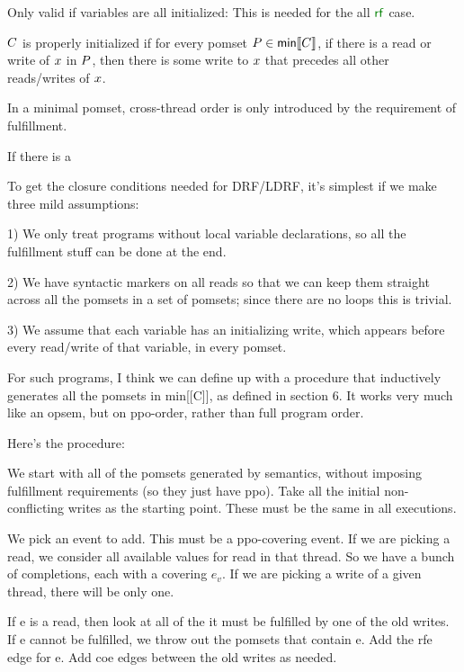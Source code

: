 

\begin{scope}
  \color{red}

  Only valid if variables are all initialized:
  This is needed for the all $\rrf$ case.
  
  $C$ is properly initialized if for every pomset
  $P\in\textsf{min}\llbracket C\rrbracket$, if there is a read or write of $x$ in $P$,
  then there is some write to $x$ that precedes all other reads/writes of
  $x$.


  In a minimal pomset, cross-thread order is only introduced by the
  requirement of fulfillment.

  If there is a 


  To get the closure conditions needed for DRF/LDRF, it's simplest if we make
  three mild assumptions:

  1) We only treat programs without local variable declarations, so all the
  fulfillment stuff can be done at the end.

  2) We have syntactic markers on all reads so that we can keep them straight
  across all the pomsets in a set of pomsets; since there are no loops this
  is trivial.

  3) We assume that each variable has an initializing write, which appears
  before every read/write of that variable, in every pomset.

  For such programs, I think we can define up with a procedure that
  inductively generates all the pomsets in min[[C]], as defined in section 6.
  It works very much like an opsem, but on ppo-order, rather than full
  program order.

  Here's the procedure:
  
  We start with all of the pomsets generated by semantics, without imposing
  fulfillment requirements (so they just have ppo).  Take all the initial
  non-conflicting writes as the starting point.  These must be the same in
  all executions.

  We pick an event to add.  This must be a ppo-covering event.  If we are
  picking a read, we consider all available values for  read in that
  thread.  So we have a bunch of completions, each with a covering $e_v$.  If
  we are picking a write of a given thread, there will be only one.

  If e is a read, then look at all of the 
  it must be fulfilled by one of the old writes.  If e cannot
  be fulfilled, we throw out the pomsets that contain e. Add the rfe edge for
  e.  Add coe edges between the old writes as needed.


\end{scope}
